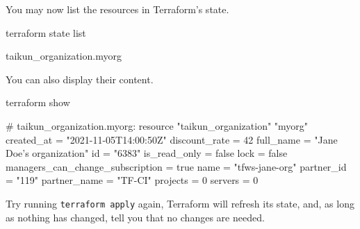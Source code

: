 You may now list the resources in Terraform's state.
\begin{shell}
terraform state list
\end{shell}
\begin{raw}
taikun_organization.myorg
\end{raw}
You can also display their content.
\begin{shell}
terraform show
\end{shell}
\begin{raw}
# taikun_organization.myorg:
resource "taikun_organization" "myorg" {
    created_at                       = "2021-11-05T14:00:50Z"
    discount_rate                    = 42
    full_name                        = "Jane Doe's organization"
    id                               = "6383"
    is_read_only                     = false
    lock                             = false
    managers_can_change_subscription = true
    name                             = "tfws-jane-org"
    partner_id                       = "119"
    partner_name                     = "TF-CI"
    projects                         = 0
    servers                          = 0
}
\end{raw}
\begin{tip}
Try running \texttt{terraform apply} again, Terraform will refresh its state, and, as long as
nothing has changed, tell you that no changes are needed.
\end{tip}
